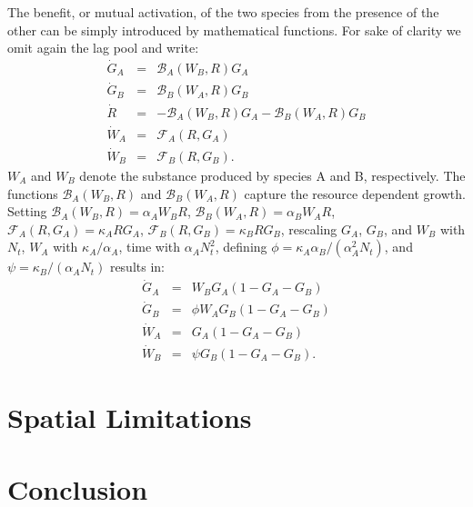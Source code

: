 \documentclass[10pt,A4paper]{article}
\begin{document}
The benefit, or mutual activation, of the two species from the presence of the other can be simply introduced by mathematical functions. 
For sake of clarity we omit again the lag pool and write:
\begin{eqnarray}
\dot{G}_A &=& \mathcal{B}_A(W_B,R)G_A\\
\dot{G}_B &=& \mathcal{B}_B(W_A,R)G_B\\
\dot{R} &=&-\mathcal{B}_A(W_B,R)G_A-\mathcal{B}_B(W_A,R)G_B\\
\dot{W}_A &=& \mathcal{F}_A(R,G_A)\\
\dot{W}_B &=& \mathcal{F}_B(R,G_B).
\end{eqnarray}
$W_A$ and $W_B$ denote the substance produced by species A and B, respectively. 
The functions $\mathcal{B}_A(W_B,R)$ and $\mathcal{B}_B(W_A,R)$ capture the resource dependent growth. 
Setting $\mathcal{B}_A(W_B,R)=\alpha_A W_BR$, $\mathcal{B}_B(W_A,R)=\alpha_B W_AR$, $\mathcal{F}_A(R,G_A)=\kappa_A RG_A$, $\mathcal{F}_B(R,G_B)=\kappa_B RG_B$, rescaling $G_A$, $G_B$, and $W_B$ with $N_t$, $W_A$ with $\kappa_A/\alpha_A$, time with $\alpha_AN_t^2$, defining $\phi=\kappa_A\alpha_B/(\alpha_A^2N_t)$, and $\psi=\kappa_B/(\alpha_A N_t)$ results in: 
\begin{eqnarray}
\dot{G}_A &=& W_BG_A\left(1 - G_A-G_B\right )\\
\dot{G}_B &=& \phi W_AG_B\left(1 - G_A-G_B\right )\\
\dot{W}_A &=& G_A\left(1 - G_A-G_B\right )\\
\dot{W}_B &=&\psi G_B\left(1 - G_A-G_B\right ).
\end{eqnarray}

\section{Spatial Limitations}







\section{Conclusion}

\newpage
\printbibliography
\end{document}
